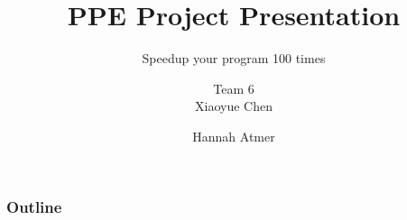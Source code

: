\documentclass{beamer}
\title{PPE Project Presentation}
\subtitle{Speedup your program 100 times}
\author{Team 6 \\Xiaoyue Chen \and Hannah Atmer}
\begin{document}
\begin{frame}
  \titlepage
\end{frame}

\begin{frame}
  \frametitle{Outline}
  \tableofcontents
\end{frame}






\end{document}
